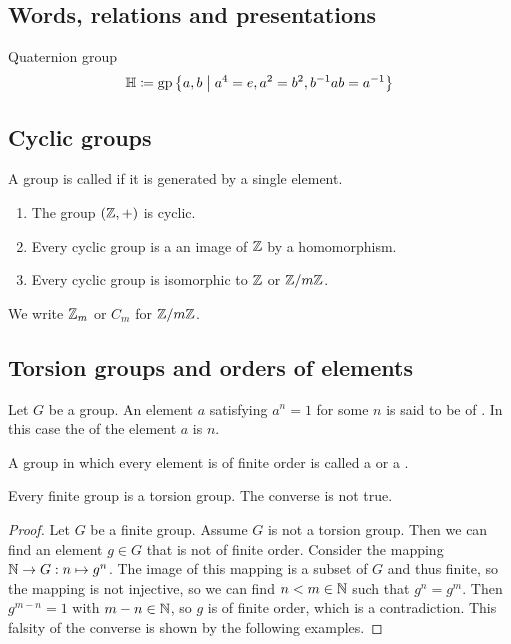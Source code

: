 \subsection{Words, relations and presentations}
\begin{example}
Quaternion group
\[ \mathbb{H} \defeq \group\setbuilder{a,b}{a^4=e, a^2=b^2, b^{-1}ab = a^{-1}} \]
\end{example}

\subsection{Cyclic groups}
\begin{definition}
A group is called  if it is generated by a single element.
\end{definition}
\begin{lemma}
\begin{enumerate}
\item The group $(\mathbb{Z}, +)$ is cyclic.
\item Every cyclic group is a an image of $\mathbb{Z}$ by a homomorphism.
\item Every cyclic group is isomorphic to $\mathbb{Z}$ or $\mathbb{Z}/m\mathbb{Z}$.
\end{enumerate}
\end{lemma}
We write $\mathbb{Z}_m$ or $C_m$ for $\mathbb{Z}/m\mathbb{Z}$.
 
\subsection{Torsion groups and orders of elements}
\begin{definition}
Let $G$ be a group. An element $a$ satisfying $a^n = 1$ for some $n$ is said to be of . In this case the  of the element $a$ is $n$.

A group in which every element is of finite order is called a  or a .
\end{definition}
\begin{lemma}
Every finite group is a torsion group. The converse is not true.
\end{lemma}
\begin{proof}
Let $G$ be a finite group. Assume $G$ is not a torsion group. Then we can find an element $g\in G$ that is not of finite order. Consider the mapping $\mathbb{N} \to G: n\mapsto g^n$. The image of this mapping is a subset of $G$ and thus finite, so the mapping is not injective, so we can find $n<m\in\mathbb{N}$ such that $g^n = g^m$. Then $g^{m-n}=1$ with $m-n\in \mathbb{N}$, so $g$ is of finite order, which is a contradiction. This falsity of the converse is shown by the following examples.
\end{proof}

